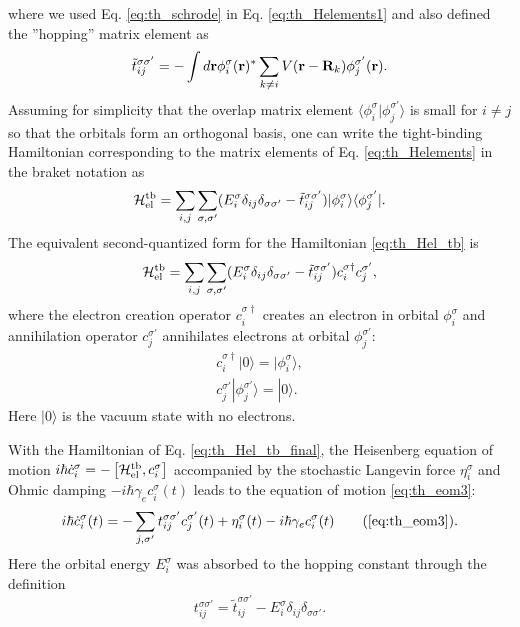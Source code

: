 where we used Eq. \eqref{eq:th_schrode} in Eq. \eqref{eq:th_Helements1} and also defined the ''hopping'' matrix element as 
\begin{equation}
  \tilde t_{ij}^{\sigma\sigma'} = - \int d\mathbf{r} \phi_i^{\sigma}(\mathbf{r})^*  \sum_{k\neq i} V(\mathbf{r}-\mathbf{R}_k)   \phi_j^{\sigma'}(\mathbf{r}).
\end{equation}
Assuming for simplicity that the overlap matrix element $\langle \phi_i^{\sigma}| \phi_j^{\sigma'} \rangle$ is small for $i\neq j$ so that the orbitals form an orthogonal basis, one can write the tight-binding Hamiltonian corresponding to the matrix elements of Eq. \eqref{eq:th_Helements} in the braket notation \cite{schwabl} as 
\begin{equation}
 \mathcal{H}_{\textrm{el}}^{\textrm{tb}} = \sum_{i,j} \sum_{\sigma,\sigma'} (E_i^{\sigma} \delta_{ij}\delta_{\sigma\sigma'}  - \tilde t_{ij}^{\sigma\sigma'})|\phi_i^{\sigma} \rangle \langle \phi_j^{\sigma'} | . \label{eq:th_Hel_tb}
\end{equation}
The equivalent second-quantized form \cite{schwabl} for the Hamiltonian \eqref{eq:th_Hel_tb} is
\begin{equation}
 \mathcal{H}_{\textrm{el}}^{\textrm{tb}} = \sum_{i,j} \sum_{\sigma,\sigma'} (E_i^{\sigma} \delta_{ij}\delta_{\sigma\sigma'}  - \tilde t_{ij}^{\sigma\sigma'}) c_i^{\sigma\dagger} c_j^{\sigma'}, \label{eq:th_Hel_tb_final}
\end{equation}
where the electron creation operator $c_i^{\sigma\dagger}$ creates an electron in orbital $\phi_i^{\sigma}$ and annihilation operator $c_j^{\sigma'}$ annihilates electrons at orbital $\phi_j^{\sigma'}$:
 \begin{subequations}
  \begin{align} 
     c_i^{\sigma\dagger} |0 \rangle = | \phi_i^{\sigma} \rangle,  \\
     c_j^{\sigma'} |\phi_j^{\sigma'} \rangle = | 0 \rangle.
  \end{align}
 \end{subequations}
Here $|0\rangle$ is the vacuum state with no electrons. 

With the Hamiltonian of Eq. \eqref{eq:th_Hel_tb_final}, the Heisenberg equation of motion $i\hbar \dot{c}_i^{\sigma} = - \left[\mathcal{H}_{\textrm{el}}^{\textrm{tb}},c_i^{\sigma} \right]$ \cite{ballentine} accompanied by the stochastic Langevin force $\eta_i^{\sigma}$ and Ohmic damping $-i\hbar \gamma_e c_i^{\sigma}(t)$ \cite{dhar03} leads to the equation of motion \eqref{eq:th_eom3}:
\begin{equation}
 i\hbar \dot{c}_i^{\sigma}(t) = -\sum_{j,\sigma'} t_{ij}^{\sigma\sigma'} c_j^{\sigma'}(t) +\eta_i^{\sigma}(t) - i\hbar \gamma_e c_i^{\sigma}(t) \tag{\ref{eq:th_eom3}}.
\end{equation}
Here the orbital energy $E_i^{\sigma}$ was absorbed to the hopping constant through the definition 
\begin{equation}
 t_{ij}^{\sigma\sigma'}=\tilde t_{ij}^{\sigma\sigma'}-E_{i}^{\sigma}\delta_{ij}\delta_{\sigma\sigma'}.
\end{equation}

